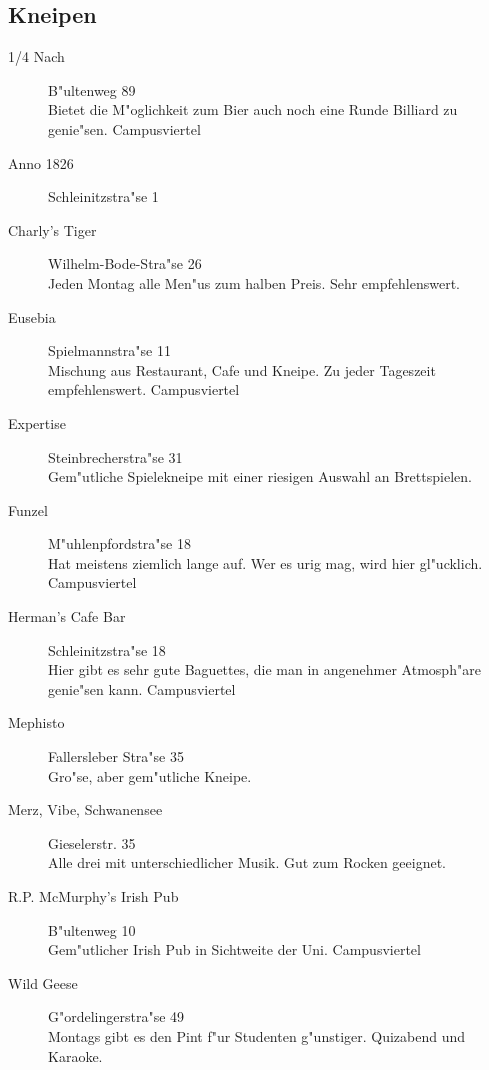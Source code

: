 \subsection{Kneipen}

\begin{description}

\item[1/4 Nach] \hfill B"ultenweg 89\\
Bietet die M"oglichkeit zum Bier auch noch eine Runde Billiard zu genie"sen.
Campusviertel\\

\item[Anno 1826] \hfill Schleinitzstra"se 1

\item[Charly's Tiger] \hfill Wilhelm-Bode-Stra"se 26\\
Jeden Montag alle Men"us zum halben Preis. Sehr empfehlenswert.


\item[Eusebia] \hfill Spielmannstra"se 11\\
Mischung aus Restaurant, Cafe und Kneipe. Zu jeder Tageszeit empfehlenswert.
Campusviertel

\item[Expertise] \hfill Steinbrecherstra"se 31\\
Gem"utliche Spielekneipe mit einer riesigen Auswahl an Brettspielen.

\item[Funzel] \hfill M"uhlenpfordstra"se 18\\
Hat meistens ziemlich lange auf. Wer es urig mag, wird hier gl"ucklich.
Campusviertel

\item[Herman's Cafe Bar] \hfill Schleinitzstra"se 18\\
Hier gibt es sehr gute Baguettes, die man in angenehmer Atmosph"are genie"sen kann.
Campusviertel\\

\item[Mephisto] \hfill Fallersleber Stra"se 35\\
Gro"se, aber gem"utliche Kneipe.

\item[Merz, Vibe, Schwanensee] \hfill Gieselerstr. 35\\
Alle drei mit unterschiedlicher Musik. Gut zum Rocken geeignet.\\

\item[R.P. McMurphy's Irish Pub] \hfill B"ultenweg 10\\
Gem"utlicher Irish Pub in Sichtweite der Uni.
Campusviertel

\item[Wild Geese] \hfill G"ordelingerstra"se 49\\
Montags gibt es den Pint f"ur Studenten g"unstiger.
Quizabend und Karaoke.\\

\end{description}
